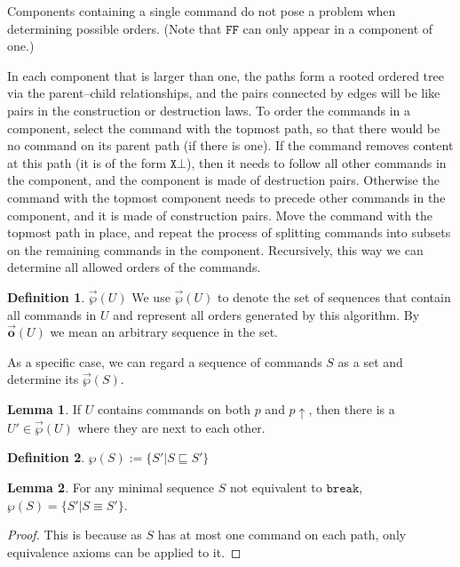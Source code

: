 \documentclass[12pt]{article}
\newcommand{\empt}{\bot}
\newcommand{\pp}{p\!\!\uparrow} %
\newcommand{\cbrk}{\mathtt{break}}
\newcommand{\fscommand}[2]{{#1#2}}
\newcommand{\fsregcommandchar}[1]{\mathtt{#1}}
\newcommand{\fsregcommand}[2]{\fscommand{\fsregcommandchar{#1}}{\fsregcommandchar{#2}}}
\newcommand{\cff}{\fsregcommand{F}{F}}
\newcommand{\eqext}{\sqsubseteq}
\newcommand{\extset}[1]{\wp({#1})}
\newcommand{\orderset}[1]{\vec{\wp}({#1})}
\newcommand{\ordered}[1]{\vec{\mathbf{o}}({#1})}
\theoremstyle{definition}
\newtheorem{mydef}{Definition}
\newtheorem{mylem}{Lemma}
\begin{document}
Components containing a single command do not pose a problem when determining
possible orders.
(Note that $\cff$ can only appear in a component of one.)

In each component that is larger than one, the paths 
form a rooted ordered tree via the parent--child relationships,
and the pairs connected by edges will be like pairs in the
construction or destruction laws.
To order the commands in a component,
select the command with the topmost path, so that there would be no command
on its parent path (if there is one). 
If the command removes content at this path (it is of the form $\fsregcommand{X}{\empt}$), then it
needs to follow all other commands in the component, and
the component is made of destruction pairs.
Otherwise the command with the topmost component needs to precede other commands
in the component, and it is made of construction pairs.
Move the command with the topmost path in place, and
repeat the process of splitting commands into subsets on the remaining commands
in the component. Recursively, this way we can determine all allowed orders of the commands.

\begin{mydef}{$\orderset{U}$}
We use $\orderset{U}$ to denote the set of sequences that contain all commands in $U$
and represent all orders generated by this algorithm.
By $\ordered{U}$ we mean an arbitrary sequence in the set.
\end{mydef}

As a specific case, we can regard a sequence of commands $S$
as a set and determine its $\orderset{S}$.

\begin{mylem}\label{lemma:neighbour}
If $U$ contains commands on both $p$ and $\pp$, then
there is a $U'\in\orderset{U}$ where they are next to each other.
\end{mylem}

\begin{mydef}
$\extset{S} := \{S'|S\eqext S'\}$
\end{mydef}

\begin{mylem}\label{lemma:minextset}
For any minimal sequence $S$ not equivalent to $\cbrk$, $\extset{S} = \{S'|S\equiv S'\}$.
\end{mylem}
\begin{proof}
This is because as $S$ has at most one command on each path, only equivalence axioms
can be applied to it.
\end{proof}
\end{document}
